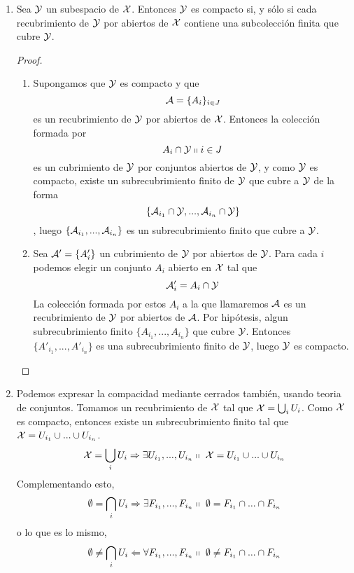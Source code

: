 \begin{obs}
	\begin{enumerate}
		\item Sea $\mathcal{Y}$ un subespacio de $\mathcal{X}$. Entonces $\mathcal{Y}$ es compacto si, y sólo si cada recubrimiento de $\mathcal{Y}$ por abiertos de $\mathcal{X}$ contiene una subcolección finita que cubre $\mathcal{Y}$.
		\begin{proof}
			\begin{enumerate}
				\item[\bra] 	Supongamos que $\mathcal{Y}$ es compacto y que 
					\begin{equation}
						\mathcal{A}=\{A_i\}_{i \in J}
					\end{equation}
					es un recubrimiento de $\mathcal{Y}$ por abiertos de $\mathcal{X}$. Entonces la colección formada por
					\begin{equation}
						{A_i \cap \mathcal{Y}\shortparallel i \in J}
					\end{equation} es un cubrimiento de $\mathcal{Y}$ por conjuntos abiertos de $\mathcal{Y}$, y como $\mathcal{Y}$ es compacto, existe un subrecubrimiento finito de $\mathcal{Y}$ que cubre a $\mathcal{Y}$ de la forma
					\begin{equation}
						\{\mathcal{A}_{i_1} \cap \mathcal{Y}, ... , \mathcal{A}_{i_n} \cap \mathcal{Y}\} 
					\end{equation}
						, luego $\{\mathcal{A}_{i_1}, ... , \mathcal{A}_{i_n}\}$ es un subrecubrimiento finito que cubre a $\mathcal{Y}$.
				
				\item[\bla] Sea $\mathcal{A}'=\{A'_{i}\}$ un cubrimiento de $\mathcal{Y}$ por abiertos de $\mathcal{Y}$. Para cada $i$ podemos elegir un conjunto $A_i$ abierto en $\mathcal{X}$ tal que 
					\begin{equation}
							\mathcal{A}'_i=A_i \cap \mathcal{Y}
					\end{equation}
					La colección formada por estos $A_i$ a la que llamaremos $\mathcal{A}$ es un recubrimiento de $\mathcal{Y}$ por abiertos de $\mathcal{A}$. Por hipótesis, algun subrecubrimiento finito $\{A_{i_1},...,A_{i_n}\}$ que cubre $\mathcal{Y}$. Entonces $\{A'_{i_1},...,A'_{i_n}\}$ es una subrecubrimiento finito de $\mathcal{Y}$, luego $\mathcal{Y}$ es compacto.
			\end{enumerate}
		\end{proof}
		\item Podemos expresar la compacidad mediante cerrados también, usando teoria de conjuntos.
		Tomamos un recubrimiento de $\mathcal{X}$ tal que $\mathcal{X} = \bigcup_{i}U_i$. Como $\mathcal{X}$ es compacto, entonces existe un subrecubrimiento finito tal que $\mathcal{X} = U_{i_1} \cup ... \cup U_{i_n}$.
		\begin{equation}
			\mathcal{X} = \bigcup_{i}U_i \Rightarrow \exists U_{i_1},..., U_{i_n} \shortparallel\ \mathcal{X} = U_{i_1} \cup ... \cup U_{i_n}
		\end{equation}
		Complementando esto,
		\begin{equation}
			\emptyset = \bigcap_{i}U_i \Rightarrow \exists F_{i_1},..., F_{i_n} \shortparallel\ \emptyset = F_{i_1} \cap ... \cap F_{i_n}
		\end{equation}
		o lo que es lo mismo,
		\begin{equation}
			\emptyset \neq \bigcap_{i}U_i \Leftarrow \forall F_{i_1},..., F_{i_n} \shortparallel\ \emptyset \neq F_{i_1} \cap ... \cap F_{i_n}
		\end{equation}
	\end{enumerate}
\end{obs}
